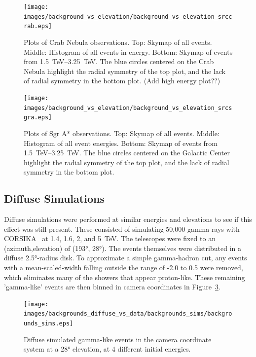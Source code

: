   \begin{figure}[ht]
    \centering
    \texttt{[image: images/background\_vs\_elevation/background\_vs\_elevation\_srccrab.eps]}
    \caption[Background Vs Elevation Crab]
    {\small 
      Plots of Crab Nebula observations.
      Top: Skymap of all events.
      Middle: Histogram of all events in energy.
      Bottom: Skymap of events from \SIrange{1.5}{3.25}{\TeV}.  
      The blue circles centered on the Crab Nebula highlight the radial symmetry of the top plot, and the lack of radial symmetry in the bottom plot.
      {\color{red}(Add high energy plot??)}
    }
    \label{fig:bkgvsel_crab}
  \end{figure}

  \begin{figure}[ht]
    \centering
    \texttt{[image: images/background\_vs\_elevation/background\_vs\_elevation\_srcsgra.eps]}
    \caption[Background Vs Elevation Sgr A*]
    {\small 
      Plots of Sgr A* observations.
      Top: Skymap of all events.
      Middle: Histogram of all event energies.
      Bottom: Skymap of events from \SIrange{1.5}{3.25}{\TeV}.  
      The blue circles centered on the Galactic Center highlight the radial symmetry of the top plot, and the lack of radial symmetry in the bottom plot.
    }
    \label{fig:bkgvsel_sgra}
  \end{figure}
  
  \FloatBarrier

  \subsection{Diffuse Simulations}\label{subsubsec:diffusesims}
    Diffuse simulations were performed at similar energies and elevations to see if this effect was still present.
    These consisted of simulating 50,000 gamma rays with CORSIKA~\cite{corsika1998} at 1.4, 1.6, 2, and \SI{5}{\TeV}.
    The telescopes were fixed to an (azimuth,elevation) of (\ang{193}, \ang{28}).
    The events themselves were distributed in a diffuse \ang{2.5}-radius disk.
    To approximate a simple gamma-hadron cut, any events with a mean-scaled-width falling outside the range of -2.0 to 0.5 were removed, which eliminates many of the showers that appear proton-like.
    These remaining 'gamma-like' events are then binned in camera coordinates in Figure~\ref{fig:back_simdiffuse}.

    \begin{figure}[ht]
      \centering
      \texttt{[image: images/backgrounds\_diffuse\_vs\_data/backgrounds\_sims/backgrounds\_sims.eps]}
      \caption[Diffuse Simulated Backgrounds]{
        Diffuse simulated gamma-like events in the camera coordinate system at a \ang{28} elevation, at 4 different initial energies.
      }
      \label{fig:back_simdiffuse}
    \end{figure}


